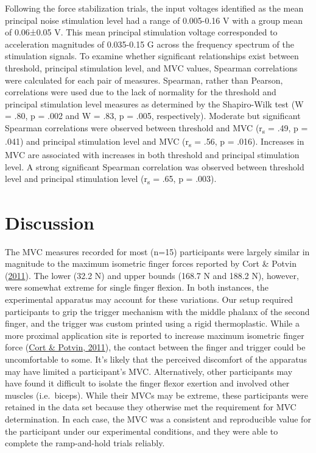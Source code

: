 \documentclass[]{cik}%
\begin{document}
Following the force stabilization trials, the input voltages identified
as the mean principal noise stimulation level had a range of 0.005-0.16
V with a group mean of 0.06±0.05 V. This mean principal stimulation
voltage corresponded to acceleration magnitudes of 0.035-0.15 G across
the frequency spectrum of the stimulation signals. To examine whether
significant relationships exist between threshold, principal stimulation
level, and MVC values, Spearman correlations were calculated for each
pair of measures. Spearman, rather than Pearson, correlations were used
due to the lack of normality for the threshold and principal stimulation
level measures as determined by the Shapiro-Wilk test (W = .80, p = .002
and W = .83, p = .005, respectively). Moderate but significant Spearman
correlations were observed between threshold and MVC (r\textsubscript{s}
= .49, p = .041) and principal stimulation level and MVC
(r\textsubscript{s} = .56, p = .016). Increases in MVC are associated
with increases in both threshold and principal stimulation level. A
strong significant Spearman correlation was observed between threshold
level and principal stimulation level (r\textsubscript{s} = .65, p =
.003).

\hypertarget{discussion}{%
\section{Discussion}\label{discussion}}

The MVC measures recorded for most (n=15) participants were largely
similar in magnitude to the maximum isometric finger forces reported by
Cort \& Potvin (\protect\hyperlink{ref-cort2011}{2011}). The lower (32.2
N) and upper bounds (168.7 N and 188.2 N), however, were somewhat
extreme for single finger flexion. In both instances, the experimental
apparatus may account for these variations. Our setup required
participants to grip the trigger mechanism with the middle phalanx of
the second finger, and the trigger was custom printed using a rigid
thermoplastic. While a more proximal application site is reported to
increase maximum isometric finger force
(\protect\hyperlink{ref-cort2011}{Cort \& Potvin, 2011}), the contact
between the finger and trigger could be uncomfortable to some. It's
likely that the perceived discomfort of the apparatus may have limited a
participant's MVC. Alternatively, other participants may have found it
difficult to isolate the finger flexor exertion and involved other
muscles (i.e.~biceps). While their MVCs may be extreme, these
participants were retained in the data set because they otherwise met
the requirement for MVC determination. In each case, the MVC was a
consistent and reproducible value for the participant under our
experimental conditions, and they were able to complete the
ramp-and-hold trials reliably.
\end{document}
